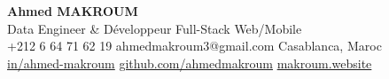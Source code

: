 \documentclass[10pt,a4paper,sans]{moderncv}
\begin{document}
\begin{center}
    {\fontsize{20}{22}\selectfont\textbf{Ahmed MAKROUM}}\\[0.5em]
    {\fontsize{13.2}{15.4}\selectfont Data Engineer \& Développeur Full-Stack Web/Mobile} \\[0.4em]
    {\fontsize{10.5}{12.3}\selectfont
        \faMobile\enspace +212 6 64 71 62 19 \quad
        \faEnvelope\enspace ahmedmakroum3@gmail.com \quad
        \faHome\enspace Casablanca, Maroc \\[0.3em]
        \faLinkedin\enspace \href{https://www.linkedin.com/in/ahmed-makroum/}{in/ahmed-makroum} \quad
        \faGithub\enspace \href{https://github.com/ahmedmakroum}{github.com/ahmedmakroum} \quad
        \faGlobe\enspace \href{https://makroum.website}{makroum.website}
    }\\[0.5em]
\end{center}
\vspace{-25pt}


\end{document}
